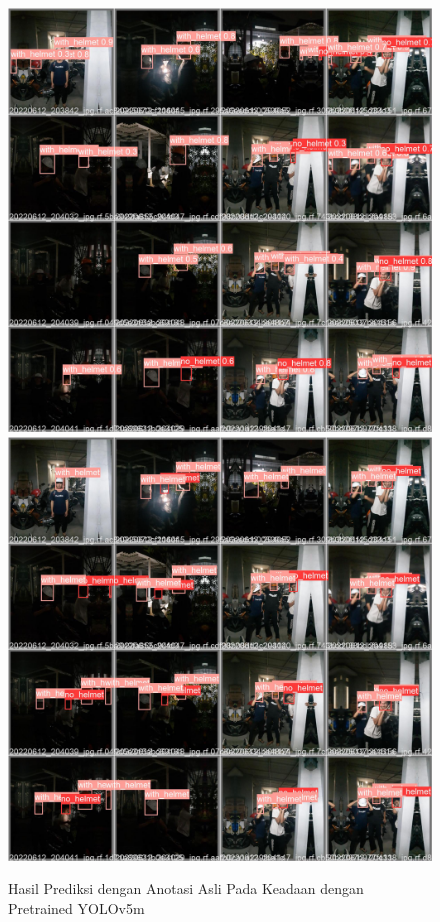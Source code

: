 \begin{figure}[ht]
  \centering
  \includegraphics[scale=0.1]{gambar/train_v2_val/low_ligjt/customNano/val_batch0_pred.jpg}
  \includegraphics[scale=0.1]{gambar/train_v2_val/low_ligjt/customNano/val_batch0_labels.jpg}
  \caption{Hasil Prediksi dengan Anotasi Asli Pada Keadaan dengan Pretrained YOLOv5m}
\end{figure}
